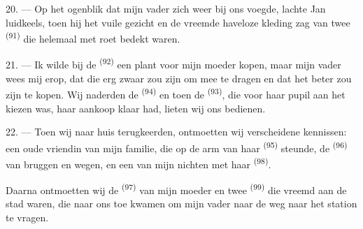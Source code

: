 \VUsaut{3.0mm}

20. --- Op het ogenblik dat mijn vader zich weer bij ons voegde, lachte Jan luidkeels, toen
hij het vuile gezicht en de vreemde haveloze kleding zag van twee
 \textsuperscript{(91)} die helemaal met roet bedekt
waren.

21. --- Ik wilde bij de  \textsuperscript{(92)} een plant voor mijn
moeder kopen, maar mijn vader wees mij erop, dat die erg zwaar zou zijn om mee te dragen en
dat het beter zou zijn  te kopen. Wij naderden de 
\textsuperscript{(94)} en toen de
 \textsuperscript{(93)}, die voor haar pupil aan het kiezen
was, haar aankoop klaar had, lieten wij ons bedienen.

22. --- Toen wij naar huis terugkeerden, ontmoetten wij verscheidene kennissen: een oude
vriendin van mijn familie, die op de arm van haar 
\textsuperscript{(95)} steunde, de  \textsuperscript{(96)} van bruggen en
wegen, en een van mijn nichten met haar  \textsuperscript{(98)}.

Daarna ontmoetten wij de  \textsuperscript{(97)} van mijn moeder en twee
 \textsuperscript{(99)} die vreemd aan de stad waren, die naar ons toe kwamen
om mijn vader naar de weg naar het station te vragen.
\VUsaut{6.0mm}
\VUfilet{22mm}
